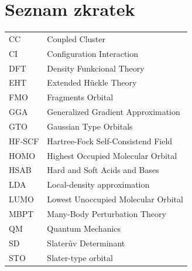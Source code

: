 \documentclass[
  printed, %
  table,   %
  lof,     %
  lot,     %
  oneside,
]{fithesis3}
\begin{document}
\chapter*{Seznam zkratek}
\begin{table}[htbp]
\begin{tabular}{l l}
CC & Coupled Cluster \\ 
CI & Configuration Interaction \\ 
DFT & Density Funkcional Theory \\
EHT & Extended Hückle Theory \\ 
FMO & Fragments Orbital \\ 
GGA &  Generalized Gradient Approximation \\ 
GTO & Gaussian Type Orbitals \\ 
HF-SCF & Hartree-Fock Self-Consistend Field \\ 
HOMO  & Highest Occupied Molecular Orbital \\ 
HSAB & Hard and Soft Acids and Bases \\ 
LDA & Local-density approximation \\ 
LUMO & Lowest Unoccupied Molecular Orbital \\ 
MBPT &  Many-Body Perturbation Theory \\ 
QM & Quantum Mechanics \\ 
SD & Slaterův Determinant \\ 
STO & Slater-type orbital  \\ 
\end{tabular}
\end{table}

\end{document}
